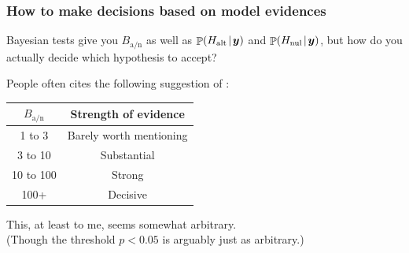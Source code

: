 \documentclass[18pt, handout]{beamer}
\newcommand{\given}{\mskip.7\thinmuskip | \mskip.7\thinmuskip}
\DeclareMathOperator{\probability}{\mathbb{P}}
\newcommand{\by}{\bm{y}}
\newcommand{\hypothesis}{H}
\newcommand{\nullSub}{\mathrm{nul}}
\newcommand{\altSub}{\mathrm{alt}}
\newcommand{\bayesFacAlt}{B_{\mathrm{a} / \mathrm{n}}}
\begin{document}
\begin{frame}
\begin{minipage}{.32\linewidth}
\begin{figure}
	\end{figure}
\end{minipage}
\end{frame}


\begin{frame}
\frametitle{How to make decisions based on model evidences}
Bayesian tests give you $\bayesFacAlt$ as well as $\probability(\hypothesis_\altSub \given \by)$ and $\probability(\hypothesis_\nullSub \given \by)$,
but how do you actually decide which hypothesis to accept?

\smallskip
People often cites the following suggestion of \cite{jeffreys1961theory_of_probability}:
\vspace*{-.5\baselineskip}
\begin{center}
\begin{tabular}{c|c} 
$\bayesFacAlt$ & Strength of evidence \\ [0.5ex] 
 \hline\hline
1 to 3 & Barely worth mentioning \\ 
 \hline
3 to 10 & Substantial \\
 \hline
10 to 100 & Strong \\
 \hline
 100+ & Decisive 
\end{tabular}
\end{center}
This, at least to me, seems somewhat arbitrary.\\ 
(Though the threshold $p < 0.05$ is arguably just as arbitrary.)
\end{frame}
\end{document}
